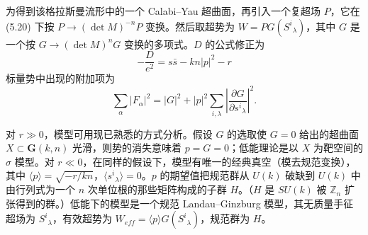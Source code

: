 

为得到该格拉斯曼流形中的一个 Calabi--Yau 超曲面，再引入一个复超场 $P$，它在 (5.20) 下按 $P\to(\det M)^{-n}P$ 变换。然后取超势为 $W=PG(S^{i}{}_{\lambda})$，其中 $G$ 是一个按 $G\to(\det M)^{n}G$ 变换的多项式。$D$ 的公式修正为
\begin{equation}\tag{5.23}
-\frac{D}{e^2}=s\bar{s}-kn|p|^2-r
\end{equation}
标量势中出现的附加项为
\begin{equation}\tag{5.24}
\sum_\alpha|F_\alpha|^2=|G|^2+|p|^2\sum_{i,\lambda}\left|\frac{\partial G}{\partial s^{i}{}_{\lambda}}\right|^2.
\end{equation}


对 $r\gg0$，模型可用现已熟悉的方式分析。假设 $G$ 的选取使 $G=0$ 给出的超曲面 $X\subset\mathbf{G}(k,n)$ 光滑，则势的消失意味着 $p=G=0$；低能理论是以 $X$ 为靶空间的 $\sigma$ 模型。对 $r\ll0$，在同样的假设下，模型有唯一的经典真空（模去规范变换），其中 $\langle p\rangle=\sqrt{-r/kn}$，$\langle s^{i}{}_{\lambda}\rangle=0$。$p$ 的期望值把规范群从 $U(k)$ 破缺到 $U(k)$ 中由行列式为一个 $n$ 次单位根的那些矩阵构成的子群 $H$。（$H$ 是 $SU(k)$ 被 $\mathbb{Z}_n$ 扩张得到的群。）低能下的模型是一个规范 Landau--Ginzburg 模型，其无质量手征超场为 $S^{i}{}_{\lambda}$，有效超势为 $W_{eff}=\langle p\rangle G(S^{i}{}_{\lambda})$，规范群为 $H$。

